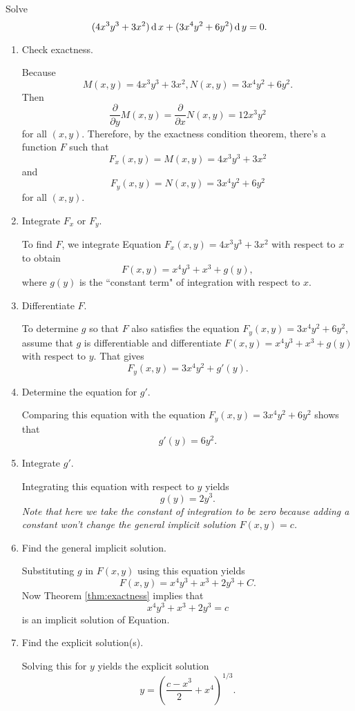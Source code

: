 \begin{example}
  Solve
\[(4x^3y^3+3x^2)\operatorname{d} x+(3x^4y^2+6y^2)\operatorname{d} y=0.\]
\end{example}
\begin{solution}
  \begin{enumerate}[label={Step \arabic*:}, leftmargin=*]
    \item Check exactness.
  
    Because 
  \[M(x,y)=4x^3y^3+3x^2, N(x,y)=3x^4y^2+6y^2.\]
  Then 
  \[\frac{\partial}{\partial y} M(x,y)=\frac{\partial}{\partial x} N(x,y)=12 x^3y^2\] 
  for all $(x,y)$. Therefore, by the exactness condition theorem, there’s a function $F$ such that
  \[F_x(x,y)=M(x,y)=4x^3y^3+3x^2\]
  and  
  \[F_y(x,y)=N(x,y)=3x^4y^2+6y^2\]
  for all $(x,y)$.
  
  \item Integrate $F_x$ or $F_y$.
  
  To find $F$, we integrate Equation $F_x(x,y)=4x^3y^3+3x^2$ with respect to $x$ to obtain
  \[F(x,y)=x^4y^3+x^3+g(y),\]
  where $g(y)$ is the ``constant term" of integration with respect to $x$.

  \item Differentiate $F$.
  
  To determine $g$ so that $F$ also satisfies the equation $F_y(x,y)=3x^4y^2+6y^2$, assume that $g$ is differentiable and differentiate $F(x,y)=x^4y^3+x^3+g(y)$ with respect to $y$. That gives
  \[F_y(x,y)=3x^4y^2+g'(y).\]

  \item Determine the equation for $g'$.
  
  Comparing this equation with the equation $F_y(x,y)=3x^4y^2+6y^2$ shows that
  \[g'(y)=6y^2.\]

  \item Integrate $g'$.
  
  Integrating this equation with respect to $y$ yields
  \[g(y)=2y^3.\]
  \emph{Note that here we take the constant of integration to be zero because adding a constant won't change the general implicit solution $F(x, y)=c$.}

  \item Find the general implicit solution.
  
  Substituting $g$ in $F(x, y)$ using this equation yields
  \[F(x,y)=x^4y^3+x^3+2y^3+C.\]
  Now Theorem \ref{thm:exactness} implies that \[x^4y^3+x^3+2y^3=c\] is an implicit solution of Equation.
  
  \item Find the explicit solution(s).
  
  Solving this for $y$ yields the explicit solution
  \[y=\left(\frac{c-x^3}{2}+x^4\right)^{1/3}.\]
\end{enumerate}
\end{solution}

